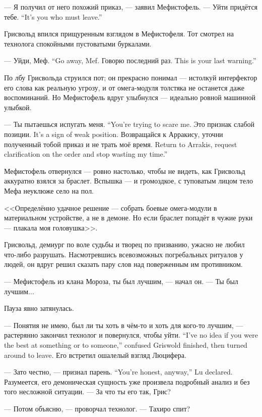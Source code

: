 --- Я получил от него похожий приказ, --- заявил Мефистофель.
{--- Уйти придётся тебе.}
{``It's you who must leave.''}

Грисвольд впился прищуренным взглядом в Мефистофеля.
Тот смотрел на технолога спокойными пустоватыми буркалами.

{--- Уйди, Меф.}
{``Go away, Mef.}
{Говорю последний раз.}
{This is your last warning.''}

По лбу Грисвольда струился пот;
он прекрасно понимал --- истолкуй интерфектор его слова как реальную угрозу, и от омега-модуля толстяка не останется даже воспоминаний.
Но Мефистофель вдруг улыбнулся --- идеально ровной машинной улыбкой.

{--- Ты пытаешься испугать меня.}
{``You're trying to scare me.}
{Это признак слабой позиции.}
{It's a sign of weak position.}
{Возвращайся к Арракису, уточни полученный тобой приказ и не трать моё время.}
{Return to Arrakis, request clarification on the order and stop wasting my time.''}

Мефистофель отвернулся --- ровно настолько, чтобы не видеть, как Грисвольд аккуратно взялся за браслет.
Вспышка --- и громоздкое, с туповатым лицом тело Мефа неуклюже село на пол.

<<Определённо удачное решение --- собрать боевые омега-модули в материальном устройстве, а не в демоне.
Но если браслет попадёт в чужие руки --- плакала моя головушка>>.

Грисвольд, демиург по воле судьбы и творец по призванию, ужасно не любил что-либо разрушать.
Насмотревшись всевозможных погребальных ритуалов у людей, он вдруг решил сказать пару слов над поверженным им противником.

--- Мефистофель из клана Мороза, ты был лучшим, --- начал он.
--- Ты был лучшим...

Пауза явно затянулась.

{--- Понятия не имею, был ли ты хоть в чём-то и хоть для кого-то лучшим, --- растерянно закончил технолог и повернулся, чтобы уйти.}
{``I've no idea if you were the best at something or to someone,'' confused Griswold finished, then turned around to leave.}
Его встретил ошалелый взгляд Люцифера.

{--- Зато честно, --- признал парень.}
{``You're honest, anyway,'' Lu declared.}
Разумеется, его демоническая сущность уже произвела подробный анализ и без того несложной ситуации.
--- За что ты его так, Грис?

--- Потом объясню, --- проворчал технолог.
--- Тахиро спит?

